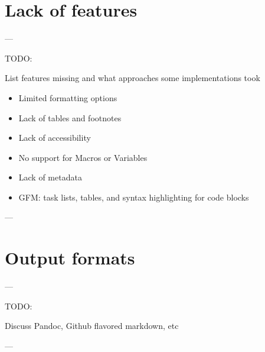\section{Lack of features}

---

TODO:

List features missing and what approaches some implementations took

\begin{itemize}
    \item Limited formatting options
    \item Lack of tables and footnotes
    \item Lack of accessibility
    \item No support for Macros or Variables
    \item Lack of metadata
    \item GFM: task lists, tables, and syntax highlighting for code blocks
\end{itemize}

---

\section{Output formats}

---

TODO:

Discuss Pandoc, Github flavored markdown, etc

---
